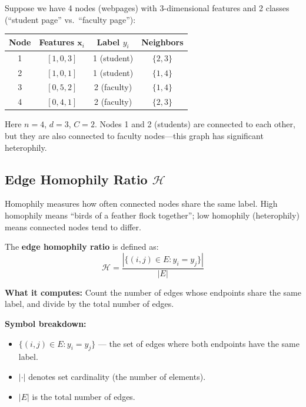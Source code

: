 \documentclass[11pt,a4paper]{article}
\newcommand{\bx}{\mathbf{x}}
\theoremstyle{definition}
\theoremstyle{plain}
\begin{document}
\begin{example}
Suppose we have 4 nodes (webpages) with 3-dimensional features and 2 classes (``student page'' vs.\ ``faculty page''):

\begin{center}
\begin{tabular}{cccc}
\toprule
Node & Features $\bx_i$ & Label $y_i$ & Neighbors \\
\midrule
1 & $[1, 0, 3]$ & 1 (student) & $\{2, 3\}$ \\
2 & $[1, 0, 1]$ & 1 (student) & $\{1, 4\}$ \\
3 & $[0, 5, 2]$ & 2 (faculty) & $\{1, 4\}$ \\
4 & $[0, 4, 1]$ & 2 (faculty) & $\{2, 3\}$ \\
\bottomrule
\end{tabular}
\end{center}

Here $n = 4$, $d = 3$, $C = 2$.
Nodes 1 and 2 (students) are connected to each other,
but they are also connected to faculty nodes---this graph has significant heterophily.
\end{example}


\subsection{Edge Homophily Ratio $\mathcal{H}$}
\label{sec:homophily}

\begin{keyidea}
Homophily measures how often connected nodes share the same label.
High homophily means ``birds of a feather flock together''; low homophily
(heterophily) means connected nodes tend to differ.
\end{keyidea}

The \textbf{edge homophily ratio} is defined as:
\[
  \mathcal{H} = \frac{|\{(i,j) \in E : y_i = y_j\}|}{|E|}
\]

\textbf{What it computes:}
Count the number of edges whose endpoints share the same label, and divide by
the total number of edges.

\textbf{Symbol breakdown:}
\begin{itemize}[nosep]
  \item $\{(i,j) \in E : y_i = y_j\}$ --- the set of edges where both endpoints
    have the same label.
  \item $|\cdot|$ denotes set cardinality (the number of elements).
  \item $|E|$ is the total number of edges.
\end{itemize}
\end{document}
